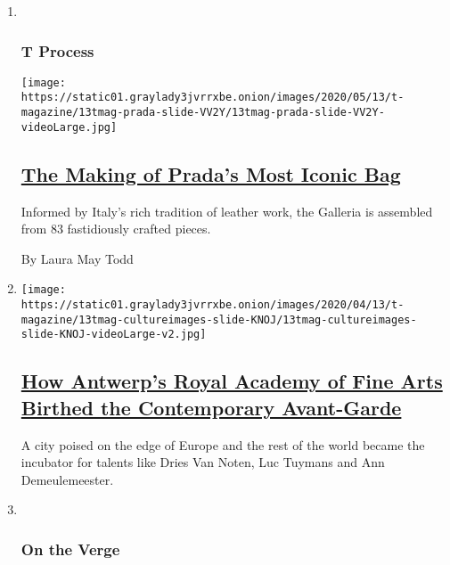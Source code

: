 \begin{enumerate}
\def\labelenumi{\arabic{enumi}.}
\item ~
  \hypertarget{t-process}{%
  \subsubsection{T Process}\label{t-process}}

  \texttt{[image: https://static01.graylady3jvrrxbe.onion/images/2020/05/13/t-magazine/13tmag-prada-slide-VV2Y/13tmag-prada-slide-VV2Y-videoLarge.jpg]}

  \hypertarget{the-making-of-pradas-most-iconic-bag}{%
  \subsection{\texorpdfstring{\href{/2020/05/13/t-magazine/prada-handbag-making-of.html}{The
  Making of Prada's Most Iconic
  Bag}}{The Making of Prada's Most Iconic Bag}}\label{the-making-of-pradas-most-iconic-bag}}

  Informed by Italy's rich tradition of leather work, the Galleria is
  assembled from 83 fastidiously crafted pieces.

  By Laura May Todd
\item
  \texttt{[image: https://static01.graylady3jvrrxbe.onion/images/2020/04/13/t-magazine/13tmag-cultureimages-slide-KNOJ/13tmag-cultureimages-slide-KNOJ-videoLarge-v2.jpg]}

  \hypertarget{how-antwerps-royal-academy-of-fine-arts-birthed-the-contemporary-avant-garde}{%
  \subsection{\texorpdfstring{\href{/interactive/2020/04/13/t-magazine/royal-academy-antwerp.html}{How
  Antwerp's Royal Academy of Fine Arts Birthed the Contemporary
  Avant-Garde}}{How Antwerp's Royal Academy of Fine Arts Birthed the Contemporary Avant-Garde}}\label{how-antwerps-royal-academy-of-fine-arts-birthed-the-contemporary-avant-garde}}

  A city poised on the edge of Europe and the rest of the world became
  the incubator for talents like Dries Van Noten, Luc Tuymans and Ann
  Demeulemeester.
\item ~
  \hypertarget{on-the-verge}{%
  \subsubsection{On the Verge}\label{on-the-verge}}


\end{enumerate}
